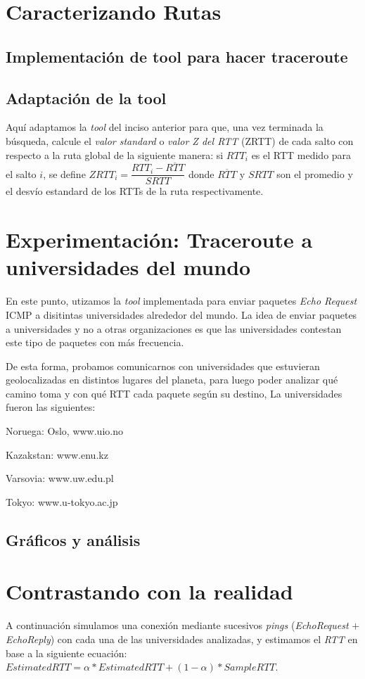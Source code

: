 \documentclass[final,inline,a4paper,narroweqnarray]{ieee}
\let\Oldsection\section
\renewcommand{\section}{\FloatBarrier\Oldsection}
\let\Oldsubsection\subsection
\renewcommand{\subsection}{\FloatBarrier\Oldsubsection}
\begin{document}
\section{ Caracterizando Rutas}

\subsection{ Implementación de tool para hacer traceroute }

\subsection{ Adaptación de la tool }
Aquí adaptamos la \emph{tool} del inciso anterior para que, una vez terminada la búsqueda, calcule el \emph{valor standard}  o \emph{valor Z del RTT} (ZRTT) de cada salto con respecto a la ruta global de la siguiente manera: si $RTT_i$ es el RTT medido para el salto $i$, se define $ ZRTT_i = \dfrac{RTT_i - \overline{RTT}}{SRTT} $ donde $\overline{RTT}$ y $SRTT$ son el promedio y el desvío estandard de los RTTs de la ruta respectivamente.  

\section{ Experimentación: Traceroute a universidades del mundo }
En este punto, utizamos la \emph{tool} implementada para enviar paquetes \emph{Echo Request} ICMP a disitintas universidades alrededor del mundo. La idea de enviar paquetes a universidades y no a otras organizaciones es que las universidades contestan este tipo de paquetes con más frecuencia.

De esta forma, probamos comunicarnos con universidades que estuvieran geolocalizadas en distintos lugares del planeta, para luego poder analizar qué camino toma y con qué RTT cada paquete según su destino, 
La universidades fueron las siguientes:

Noruega: Oslo, www.uio.no


Kazakstan: www.enu.kz


Varsovia: www.uw.edu.pl


Tokyo: www.u-tokyo.ac.jp 

\subsection{Gráficos y análisis}

\section{ Contrastando con la realidad }
A continuación simulamos una conexión mediante sucesivos \emph{pings} (\emph{EchoRequest} $+$ \emph{EchoReply}) con cada una de las universidades analizadas, y estimamos el \emph{RTT} en base a la siguiente ecuación: $ EstimatedRTT = \alpha * EstimatedRTT + (1 - \alpha) * SampleRTT $. 
\end{document}
